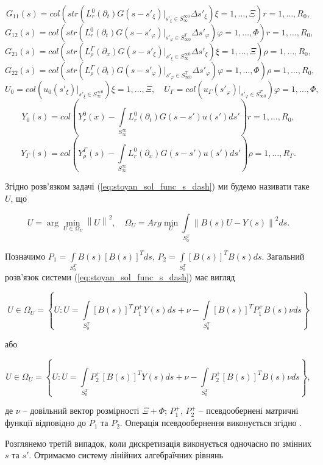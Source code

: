 \[
G_{11}(s)=col\left(str\left(L_r^0(\partial_t)G(s-s'_\xi)\bigg|_{s'_\xi\in S_\infty^{\infty 0}} \Delta s'_\xi \right)\xi=1,\ldots,\Xi\right)r=1,\ldots,R_0,
\]
\[
G_{12}(s)=col\left(str\left(L_r^0(\partial_t)G(s-s'_\varphi)\bigg|_{s'_\varphi\in S_{\infty 0}^{T}} \Delta s'_\varphi \right)\varphi=1,\ldots,\Phi\right)r=1,\ldots,R_0,
\]
\[
G_{21}(s)=col\left(str\left(L_\rho^\Gamma(\partial_x)G(s-s'_\xi)\bigg|_{s'_\xi\in S_\infty^{\infty 0}} \Delta s'_\xi \right)\xi=1,\ldots,\Xi\right)\rho=1,\ldots,R_0,
\]
\[
G_{22}(s)=col\left(str\left(L_\rho^\Gamma(\partial_t)G(s-s'_\varphi)\bigg|_{s'_\varphi\in S_{\infty 0}^{T}} \Delta s'_\varphi \right)\varphi=1,\ldots,\Phi\right)\rho=1,\ldots,R_0,
\]
\[
U_0=col\left(u_0(s'_\xi)\bigg|_{s'_\xi\in S_\infty^{\infty 0}}\right)\xi=1,\ldots,\Xi,\quad
U_\Gamma=col\left(u_\Gamma(s'_\varphi)\bigg|_{s'_\varphi\in S_{\infty 0}^{T}}\right)\varphi=1,\ldots,\Phi,
\]
\[
Y_0(s) = col\left(Y_r^0(x) - \int\limits_{S_\infty^\infty}L_r^0(\partial_t)G(s-s')u(s')ds' \right)r=1,\ldots,R_0,
\]
\[
Y_\Gamma(s) = col\left(Y_\rho^\Gamma(s) - \int\limits_{S_\infty^\infty}L_r^0(\partial_x)G(s-s')u(s')ds' \right)\rho=1,\ldots,R_\Gamma.
\]


Згідно \cite{Skopetskiy-Matematychne} розв’язком задачі (\ref{eq:stoyan_sol_func_s_dash}) ми будемо називати таке $U$, що

\[
U = \arg\min_{U \in \Omega_U}\left\|U\right\|^2,\quad
\Omega_U = Arg \min_{U}\int\limits_{S_0^T}\left\|B(s)U - Y(s)\right\|^2ds.
\]


Позначимо $P_1=\int\limits_{S_0^T}B(s)[B(s)]^Tds$, $P_2=\int\limits_{S_0^T}[B(s)]^TB(s)ds$.
Загальний розв’язок системи (\ref{eq:stoyan_sol_func_s_dash}) має вигляд

\[
U\in\Omega_U=\left\{U:U = \int\limits_{S_0^T}[B(s)]^T P_1^+Y(s)ds +\nu-
\int\limits_{S_0^T}[B(s)]^TP_1^+B(s)\nu ds\right\}
\]

або

\[
U\in\Omega_U=\left\{U:U = \int\limits_{S_0^T} P_2^+[B(s)]^TY(s)ds +\nu-
\int\limits_{S_0^T}P_2^+[B(s)]^TB(s)\nu ds\right\},
\]

де $\nu$ – довільний вектор розмірності $\Xi+\Phi$; $P_1^+$, $P_2^+$ – псевдообернені матричні
функції відповідно до $P_1$ та $P_2$. Операція
псевдообернення виконується згідно \cite{Skopetskiy-Matematychne}.

Розглянемо третій випадок, коли дискретизація виконується одночасно по змінних $s$ та $s'$. Отримаємо систему
лінійних алгебраїчних рівнянь

